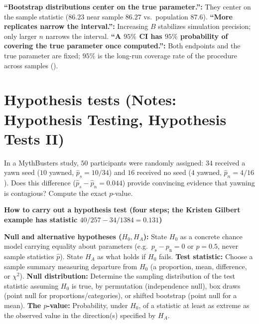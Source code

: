 \documentclass[10pt]{scrartcl}
\newenvironment{howto}[1]{\begin{mdframed}[style=howtostyle]{\color{NavyBlue}\textbf{#1}}\par\vspace{2pt}}{\end{mdframed}}
\begin{document}
\begin{trapbox}
  \ii \textbf{``Bootstrap distributions center on the true parameter.'':} They center on the sample statistic ($86.23$ near sample $86.27$ vs.\ population $87.6$).
  \ii \textbf{``More replicates narrow the interval.'':} Increasing $B$ stabilizes simulation precision; only larger $n$ narrows the interval.
  \ii \textbf{``A $95\%$ CI has $95\%$ probability of covering the true parameter once computed.'':} Both endpoints and the true parameter are fixed; $95\%$ is the long-run coverage rate of the procedure across samples ().
\end{trapbox}

\section{Hypothesis tests (Notes: Hypothesis Testing, Hypothesis Tests II)}

\begin{qbox}
  In a MythBusters study, $50$ participants were randomly assigned: $34$ received a yawn seed ($10$ yawned, $\hat p_s = 10/34$) and $16$ received no seed ($4$ yawned, $\hat p_n = 4/16$). Does this difference ($\hat p_s - \hat p_n = 0.044$) provide convincing evidence that yawning is contagious? Compute the exact $p$-value.
\end{qbox}

\begin{howto}{How to carry out a hypothesis test (four steps; the Kristen Gilbert example has statistic $40/257 - 34/1384 = 0.131$)}
\begin{enumerate}[(1)]
  \ii \textbf{Null and alternative hypotheses ($H_0, H_A$):} State $H_0$ as a concrete chance model carrying equality about parameters (e.g.\ $p_{\text{s}} - p_{\text{n}} = 0$ or $p = 0.5$, never sample statistics $\hat p$). State $H_A$ as what holds if $H_0$ fails.
  \ii \textbf{Test statistic:} Choose a sample summary measuring departure from $H_0$ (a proportion, mean, difference, or $\chi^2$).
  \ii \textbf{Null distribution:} Determine the sampling distribution of the test statistic assuming $H_0$ is true, by permutation (independence null), box draws (point null for proportions/categories), or shifted bootstrap (point null for a mean).
  \ii \textbf{The $p$-value:} Probability, under $H_0$, of a statistic at least as extreme as the observed value in the direction(s) specified by $H_A$.
\end{enumerate}
\end{howto}
\end{document}
